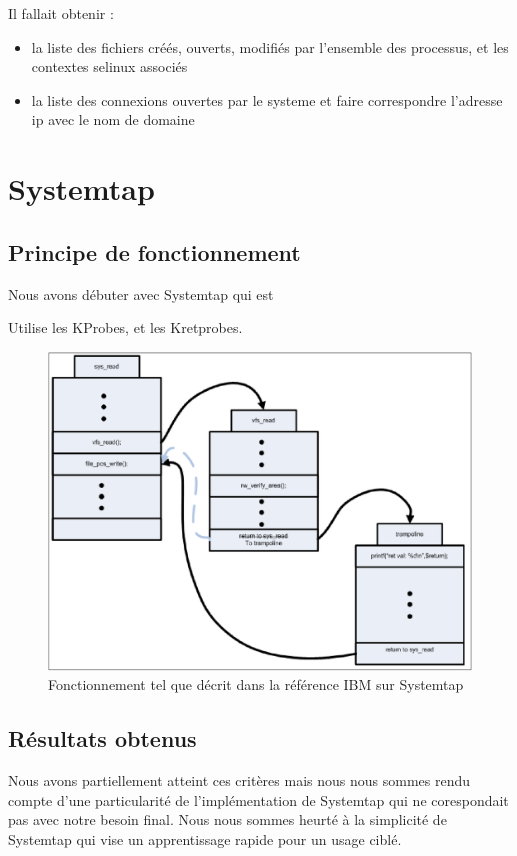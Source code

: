 \documentclass[pdftex,a4paper,titlepage,11pt,openright]{article}
\begin{document}
Il fallait obtenir :
\begin{itemize}
	\item la liste des fichiers créés, ouverts, modifiés par l'ensemble des processus, et les contextes selinux associés
	\item la liste des connexions ouvertes par le systeme et faire correspondre l'adresse ip avec le nom de domaine
\end{itemize}


\section{Systemtap}

\subsection{Principe de fonctionnement}
Nous avons débuter avec Systemtap qui est %

Utilise les KProbes, et les Kretprobes\cite{IBMRBST}.

\begin{figure}[hb]
	\centering
	\includegraphics[scale=0.4]{kretprob.png}
	\caption{Fonctionnement tel que décrit dans la référence IBM sur Systemtap \cite{IBMRBST}}
\end{figure}

\subsection{Résultats obtenus}

Nous avons partiellement atteint ces critères mais nous nous sommes rendu compte d'une particularité de l'implémentation de Systemtap qui ne corespondait pas avec notre besoin final. Nous nous sommes heurté à la simplicité de Systemtap qui vise un apprentissage rapide pour un usage ciblé.
\end{document}
